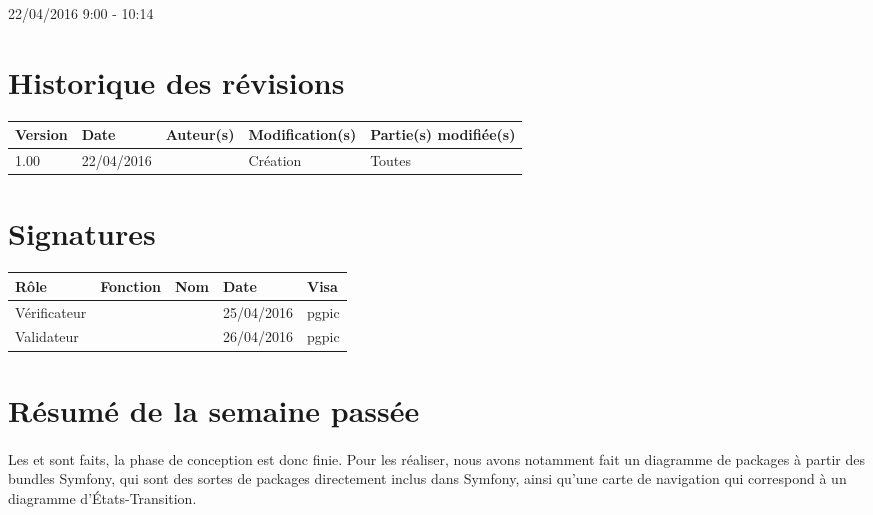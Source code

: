 \documentclass [a4paper] {article}
\begin{document}
22/04/2016			 				%
\hfill   
\hfill 	 9:00 - 10:14				%


\section*{Historique des révisions}
\begin{center}
			\begin{tabular}{| p{2.5cm} | p{3cm} | p{3cm} | p{3cm} | p{3.5cm} |}
				\hline
				\rowcolor{Gray}
				Version & Date & Auteur(s) & Modification(s) & Partie(s) modifiée(s)		 \\
				\hline
				1.00 & 22/04/2016 & \Pierre & Création & Toutes \\
		\hline		
			\end{tabular}
		\end{center}

\section*{Signatures}

		\begin{center}
			\begin{tabular}{| p{2.5cm} | p{4cm} | p{3cm} | p{3cm} | p{2.5cm} |}
				\hline
				\rowcolor{Gray}
				Rôle & Fonction & Nom & Date & Visa		 \\
				\hline
				Vérificateur & \RQA & \Kafui & 25/04/2016 & pgpic \\[30pt]
				\hline
				Validateur & \CP & \Sergi & 26/04/2016 & pgpic \\[30pt]	
				\hline
			\end{tabular}
		\end{center}


\section{Résumé de la semaine passée}
\paragraph*{}
Les \DCP{} et \DCD{} sont faits, la phase de conception est donc finie. Pour les réaliser, nous avons notamment fait un diagramme de packages à partir des bundles Symfony, qui sont des sortes de packages directement inclus dans Symfony, ainsi qu'une carte de navigation qui correspond à un diagramme d'États-Transition.
\end{document}
